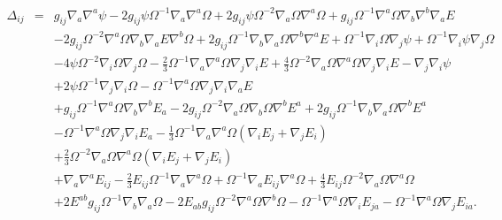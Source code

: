 \documentclass[10pt,letterpaper]{article}
\numberwithin{equation}{section}
\begin{document}
\begin{eqnarray}
\Delta_{ij}&=&g_{ij} \nabla_{a}\nabla^{a}\psi
- 2 g_{ij} \psi \Omega^{-1} \nabla_{a}\nabla^{a}\Omega
+ 2 g_{ij} \psi \Omega^{-2} \nabla_{a}\Omega \nabla^{a}\Omega
+ g_{ij} \Omega^{-1} \nabla^{a}\Omega \nabla_{b}\nabla^{b}\nabla_{a}E\nonumber\\
&& - 2 g_{ij} \Omega^{-2} \nabla^{a}\Omega \nabla_{b}\nabla_{a}E \nabla^{b}\Omega
+ 2 g_{ij} \Omega^{-1} \nabla_{b}\nabla_{a}\Omega \nabla^{b}\nabla^{a}E
+ \Omega^{-1} \nabla_{i}\Omega \nabla_{j}\psi
+ \Omega^{-1} \nabla_{i}\psi \nabla_{j}\Omega\nonumber\\
&& - 4 \psi \Omega^{-2} \nabla_{i}\Omega \nabla_{j}\Omega
-  \tfrac{2}{3} \Omega^{-1} \nabla_{a}\nabla^{a}\Omega \nabla_{j}\nabla_{i}E
+ \tfrac{4}{3} \Omega^{-2} \nabla_{a}\Omega \nabla^{a}\Omega \nabla_{j}\nabla_{i}E
-  \nabla_{j}\nabla_{i}\psi\nonumber\\
&& + 2 \psi \Omega^{-1} \nabla_{j}\nabla_{i}\Omega
-  \Omega^{-1} \nabla^{a}\Omega \nabla_{j}\nabla_{i}\nabla_{a}E
\nonumber\\
&&+g_{ij} \Omega^{-1} \nabla^{a}\Omega \nabla_{b}\nabla^{b}E_{a}
- 2 g_{ij} \Omega^{-2} \nabla_{a}\Omega \nabla_{b}\Omega \nabla^{b}E^{a}
+ 2 g_{ij} \Omega^{-1} \nabla_{b}\nabla_{a}\Omega \nabla^{b}E^{a}\nonumber\\
&& -  \Omega^{-1} \nabla^{a}\Omega \nabla_{j}\nabla_{i}E_{a}
- \tfrac{1}{3} \Omega^{-1} \nabla_{a}\nabla^{a}\Omega(\nabla_{i}E_{j}+\nabla_j E_i)
\nonumber\\
&&
+ \tfrac{2}{3} \Omega^{-2} \nabla_{a}\Omega \nabla^{a}\Omega (\nabla_{i}E_{j}+\nabla_j E_i)
\nonumber\\
&&+\nabla_{a}\nabla^{a}E_{ij}
-  \tfrac{2}{3} E_{ij} \Omega^{-1} \nabla_{a}\nabla^{a}\Omega
+ \Omega^{-1} \nabla_{a}E_{ij} \nabla^{a}\Omega
+ \tfrac{4}{3} E_{ij} \Omega^{-2} \nabla_{a}\Omega \nabla^{a}\Omega\nonumber\\
&& + 2 E^{ab} g_{ij} \Omega^{-1} \nabla_{b}\nabla_{a}\Omega
- 2 E_{ab} g_{ij} \Omega^{-2} \nabla^{a}\Omega \nabla^{b}\Omega
-  \Omega^{-1} \nabla^{a}\Omega \nabla_{i}E_{ja}
-  \Omega^{-1} \nabla^{a}\Omega \nabla_{j}E_{ia}.
\end{eqnarray}
\end{document}
